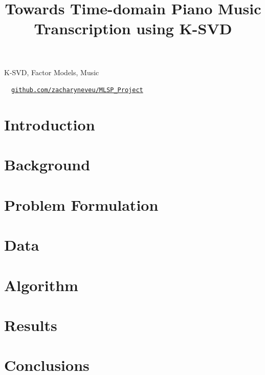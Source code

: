 \documentclass{article}
\title{Towards Time-domain Piano Music Transcription using K-SVD}
\begin{document}
%

\maketitle
%
\begin{abstract}

\end{abstract}
%
\begin{keywords}
K-SVD, Factor Models, Music
\end{keywords}

\begin{center}
\ \ \href{https://github.com/zacharyneveu/MLSP\_Project}{\texttt{github.com/zacharyneveu/MLSP\_Project}}
\end{center}
%
\section{Introduction}
\label{sec:intro}


\section{Background}%
\label{sec:background}


\section{Problem Formulation}%
\label{sec:problem_formulation}


\section{Data}%
\label{sec:data}



\section{Algorithm}%
\label{sec:algorithm}


\section{Results}%
\label{sec:results}


\section{Conclusions}%
\label{sec:conclusions}





\end{document}
